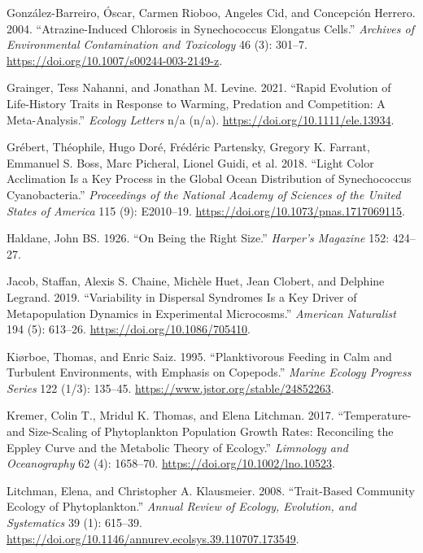 \documentclass[
  letterpaper,
  DIV=11,
  numbers=noendperiod]{scrartcl}
\begin{document}
\begin{CSLReferences}
González-Barreiro, Óscar, Carmen Rioboo, Angeles Cid, and Concepción
Herrero. 2004. {``Atrazine-{Induced Chlorosis} in {Synechococcus}
Elongatus {Cells}.''} \emph{Archives of Environmental Contamination and
Toxicology} 46 (3): 301--7.
\url{https://doi.org/10.1007/s00244-003-2149-z}.

Grainger, Tess Nahanni, and Jonathan M. Levine. 2021. {``Rapid Evolution
of Life-History Traits in Response to Warming, Predation and
Competition: {A} Meta-Analysis.''} \emph{Ecology Letters} n/a (n/a).
\url{https://doi.org/10.1111/ele.13934}.

Grébert, Théophile, Hugo Doré, Frédéric Partensky, Gregory K. Farrant,
Emmanuel S. Boss, Marc Picheral, Lionel Guidi, et al. 2018. {``Light
Color Acclimation Is a Key Process in the Global Ocean Distribution of
{Synechococcus} Cyanobacteria.''} \emph{Proceedings of the National
Academy of Sciences of the United States of America} 115 (9): E2010--19.
\url{https://doi.org/10.1073/pnas.1717069115}.

Haldane, John BS. 1926. {``On Being the Right Size.''} \emph{Harper's
Magazine} 152: 424--27.

Jacob, Staffan, Alexis S. Chaine, Michèle Huet, Jean Clobert, and
Delphine Legrand. 2019. {``Variability in Dispersal Syndromes Is a Key
Driver of Metapopulation Dynamics in Experimental Microcosms.''}
\emph{American Naturalist} 194 (5): 613--26.
\url{https://doi.org/10.1086/705410}.

Kiørboe, Thomas, and Enric Saiz. 1995. {``Planktivorous Feeding in Calm
and Turbulent Environments, with Emphasis on Copepods.''} \emph{Marine
Ecology Progress Series} 122 (1/3): 135--45.
\url{https://www.jstor.org/stable/24852263}.

Kremer, Colin T., Mridul K. Thomas, and Elena Litchman. 2017.
{``Temperature- and Size-Scaling of Phytoplankton Population Growth
Rates: {Reconciling} the {Eppley} Curve and the Metabolic Theory of
Ecology.''} \emph{Limnology and Oceanography} 62 (4): 1658--70.
\url{https://doi.org/10.1002/lno.10523}.

Litchman, Elena, and Christopher A. Klausmeier. 2008. {``Trait-{Based
Community Ecology} of {Phytoplankton}.''} \emph{Annual Review of
Ecology, Evolution, and Systematics} 39 (1): 615--39.
\url{https://doi.org/10.1146/annurev.ecolsys.39.110707.173549}.


\end{CSLReferences}
\end{document}
